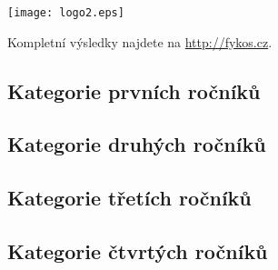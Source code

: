 \documentclass[fykos,\classoptions]{fksbatch}
\begin{document}
\maketitle


\problemsheading %

\problemtask
\problemtask
\problemtask
\problemtask
\problemtask
\problemtask
\problemtask
\problemtask

\newpage

\solutionheading %

\problemsolution
\problemsolution
\problemsolution
\problemsolution
\problemsolution
\problemsolution
\problemsolution
\newpage
\problemsolution

\vfill
\begin{center}
	\texttt{[image: logo2.eps]} 
\end{center}
\vfill

\newpage


\newpage

\resultsheading

Kompletní výsledky najdete na \url{http://fykos.cz}.

\subsection{Kategorie prvních ročníků}

\subsection{Kategorie druhých ročníků}


\subsection{Kategorie třetích ročníků}

\subsection{Kategorie čtvrtých ročníků}


\vfill

\makefooter %
\end{document}
